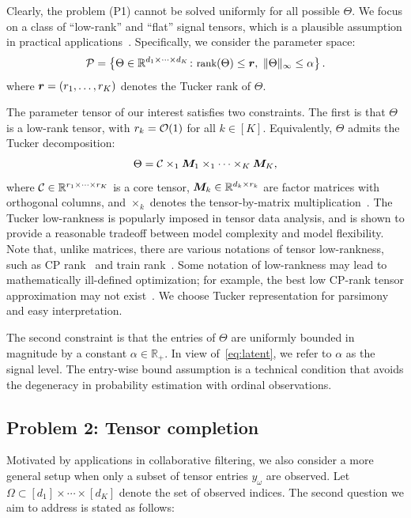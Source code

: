 \documentclass{article}
\theoremstyle{plain}
\theoremstyle{definition}
\begin{document}
Clearly, the problem (P1) cannot be solved uniformly for all possible $\Theta$. We focus on a class of ``low-rank'' and ``flat'' signal tensors, which is a plausible assumption in practical applications~\cite{zhou2013tensor,bhaskar20151}. Specifically, we consider the parameter space:
\begin{equation}\label{eq:space}
\small \tP=\left\{\Theta\in\mathbb{R}^{d_1\times \cdots \times d_K} \colon \text{rank}(\Theta)\leq \mr,\ \mnormSize{}{\Theta}\leq \alpha\right\}.
\end{equation}
where $\bm{r}=(r_1,\ldots,r_K)$ denotes the Tucker rank of $\Theta$. 

The parameter tensor of our interest satisfies two constraints. The first is that $\Theta$ is a low-rank tensor, with $r_k=\mathcal{O}(1)$ for all $k\in[K]$. Equivalently, $\Theta$ admits the Tucker decomposition:
\begin{equation}\label{eq:Tucker}
\Theta=\mathcal{C}\times_1\bm M_1\times_1 \cdots \times_K \bm M_K,
\end{equation}
where $\mathcal{C}\in\mathbb{R}^{r_1\times \cdots \times r_K}$ is a core tensor, $\bm M_k\in\mathbb{R}^{d_k\times r_k}$ are factor matrices with orthogonal columns, and $\times_k$ denotes the tensor-by-matrix multiplication~\cite{kolda2009tensor}. The Tucker low-rankness is popularly imposed in tensor data analysis, and is shown to provide a reasonable tradeoff between model complexity and model flexibility. Note that, unlike matrices, there are various notations of tensor low-rankness, such as CP rank~\cite{hitchcock1927expression} and train rank~\cite{oseledets2011tensor}. Some notation of low-rankness may lead to mathematically ill-defined optimization; for example, the best low CP-rank tensor approximation may not exist~\cite{de2008tensor}. We choose Tucker representation for parsimony and easy interpretation. 

The second constraint is that the entries of $\Theta$ are uniformly bounded in magnitude by a constant $\alpha \in \mathbb{R}_{+}$. In view of~\eqref{eq:latent}, we refer to $\alpha$ as the signal level. The entry-wise bound assumption is a technical condition that avoids the degeneracy in probability estimation with ordinal observations.

\subsection{Problem 2: Tensor completion}
Motivated by applications in collaborative filtering, we also consider a more general setup when only a subset of tensor entries $y_\omega$ are observed. Let $\Omega\subset[d_1]\times \cdots\times[d_K]$ denote the set of observed indices. The second question we aim to address is stated as follows:
\end{document}
